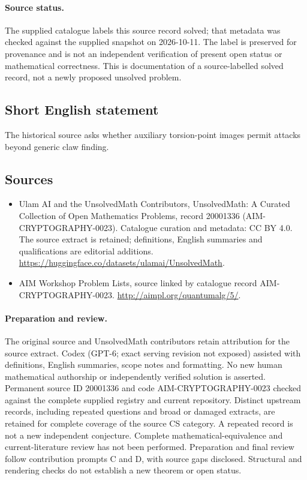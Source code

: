 \documentclass[11pt]{article}
\begin{document}
\paragraph{Source status.}
The supplied catalogue labels this source record solved; that metadata was checked against the supplied snapshot on 2026-10-11. The label is preserved for provenance and is not an independent verification of present open status or mathematical correctness. This is documentation of a source-labelled solved record, not a newly proposed unsolved problem.
\subsection{Short English statement}
The historical source asks whether auxiliary torsion-point images permit attacks beyond generic claw finding.
\subsection{Sources}
\begin{itemize}
\item[\hypertarget{source:20001336:1}{S1}] Ulam AI and the UnsolvedMath Contributors, UnsolvedMath: A Curated Collection of Open Mathematics Problems, record 20001336 (AIM-CRYPTOGRAPHY-0023). Catalogue curation and metadata: CC BY 4.0. The source extract is retained; definitions, English summaries and qualifications are editorial additions.
\url{https://huggingface.co/datasets/ulamai/UnsolvedMath}.
\item[\hypertarget{source:20001336:2}{S2}] AIM Workshop Problem Lists, source linked by catalogue record AIM-CRYPTOGRAPHY-0023.
\url{http://aimpl.org/quantumalg/5/}.
\end{itemize}
\paragraph{Preparation and review.}
The original source and UnsolvedMath contributors retain attribution for the source extract. Codex (GPT-6; exact serving revision not exposed) assisted with definitions, English summaries, scope notes and formatting. No new human mathematical authorship or independently verified solution is asserted. Permanent source ID 20001336 and code AIM-CRYPTOGRAPHY-0023 checked against the complete supplied registry and current repository. Distinct upstream records, including repeated questions and broad or damaged extracts, are retained for complete coverage of the source CS category. A repeated record is not a new independent conjecture. Complete mathematical-equivalence and current-literature review has not been performed. Preparation and final review follow contribution prompts C and D, with source gaps disclosed. Structural and rendering checks do not establish a new theorem or open status.
\label{end:20001336}
\end{document}
